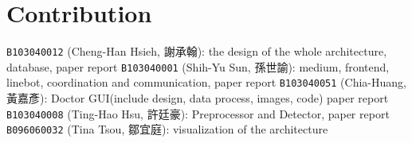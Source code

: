 \documentclass{article}
\begin{document}
\section{Contribution}
\label{sec:contribution}

\texttt{B103040012} (Cheng-Han Hsieh, 謝承翰): the design of the whole architecture, database, paper report
\texttt{B103040001} (Shih-Yu Sun, 孫世諭): medium, frontend, linebot, coordination and communication, paper report
\texttt{B103040051} (Chia-Huang, 黃嘉彥): Doctor GUI(include design, data process, images, code) paper report
\texttt{B103040008} (Ting-Hao Hsu, 許廷豪): Preprocessor and Detector, paper report
\texttt{B096060032} (Tina Tsou, 鄒宜庭): visualization of the architecture 
\end{document}
